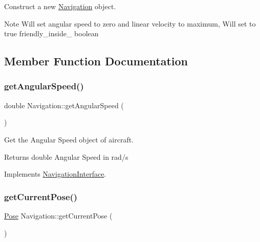 Construct a new \hyperlink{classNavigation}{Navigation} object. 

\begin{DoxyNote}{Note}
Will set angular speed to zero and linear velocity to maximum, Will set to true friendly\+\_\+inside\+\_\+ boolean 
\end{DoxyNote}


\subsection{Member Function Documentation}
\mbox{\label{classNavigation_a412ff177cefb3c4ddaf87daab3fe4c4c}} 
\subsubsection{\texorpdfstring{get\+Angular\+Speed()}{getAngularSpeed()}}
{\footnotesize\ttfamily double Navigation\+::get\+Angular\+Speed (\begin{DoxyParamCaption}{ }\end{DoxyParamCaption})\hspace{0.3cm}{\ttfamily [virtual]}}



Get the Angular Speed object of aircraft. 

\begin{DoxyReturn}{Returns}
double Angular Speed in rad/s 
\end{DoxyReturn}


Implements \hyperlink{classNavigationInterface_a9fda3919f625414f9fe68dd03deb3130}{Navigation\+Interface}.

\mbox{\label{classNavigation_af82fc8cc1546fa2a54e8a8651c1adc80}} 
\subsubsection{\texorpdfstring{get\+Current\+Pose()}{getCurrentPose()}}
{\footnotesize\ttfamily \hyperlink{structPose}{Pose} Navigation\+::get\+Current\+Pose (\begin{DoxyParamCaption}{ }\end{DoxyParamCaption})\hspace{0.3cm}{\ttfamily [virtual]}}



